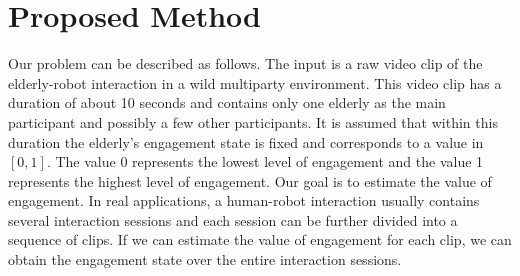 \documentclass[twocolumn]{svjour3}
\begin{document}
\section{Proposed Method}
\label{s:Engagement_Estimation_of_the_Elderly}




Our problem can be described as follows. The input is a raw video clip of the elderly-robot interaction in a wild multiparty environment. This video clip has a duration of about 10 seconds and contains only one elderly as the main participant and possibly a few other participants. It is assumed that within this duration the elderly's engagement state is fixed and corresponds to a value in $[0, 1]$. The value 0 represents the lowest level of engagement and the value 1 represents the highest level of engagement. Our goal is to estimate the value of engagement. In real applications, a human-robot interaction usually contains several interaction sessions and each session can be further divided into a sequence of clips. If we can estimate the value of engagement for each clip, we can obtain the engagement state over the entire interaction sessions.  
\end{document}
